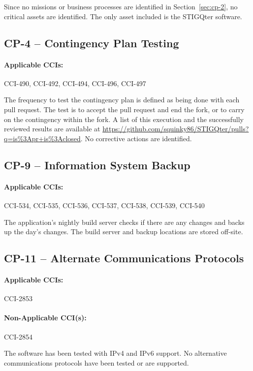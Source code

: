 \documentclass[letterpaper, 10pt, twoside]{article}
\begin{document}
Since no missions or business processes are identified in Section~\ref{sec:cp-2}, no critical assets are identified. The only asset included is the STIGQter software.

\subsection{CP-4 -- Contingency Plan Testing}

\paragraph{Applicable CCIs:} CCI-490, CCI-492, CCI-494, CCI-496, CCI-497

The frequency to test the contingency plan is defined as being done with each pull request. The test is to accept the pull request and end the fork, or to carry on the contingency within the fork. A list of this execution and the successfully reviewed results are available at \url{https://github.com/squinky86/STIGQter/pulls?q=is\%3Apr+is\%3Aclosed}. No corrective actions are identified.

\subsection{CP-9 -- Information System Backup}

\paragraph{Applicable CCIs:} CCI-534, CCI-535, CCI-536, CCI-537, CCI-538, CCI-539, CCI-540

The application's nightly build server checks if there are any changes and backs up the day's changes. The build server and backup locations are stored off-site.

\subsection{CP-11 -- Alternate Communications Protocols}

\paragraph{Applicable CCIs:} CCI-2853

\paragraph{Non-Applicable CCI(s):} CCI-2854

The software has been tested with IPv4 and IPv6 support. No alternative communications protocols have been tested or are supported.

\clearpage
\printbibliography
\end{document}
